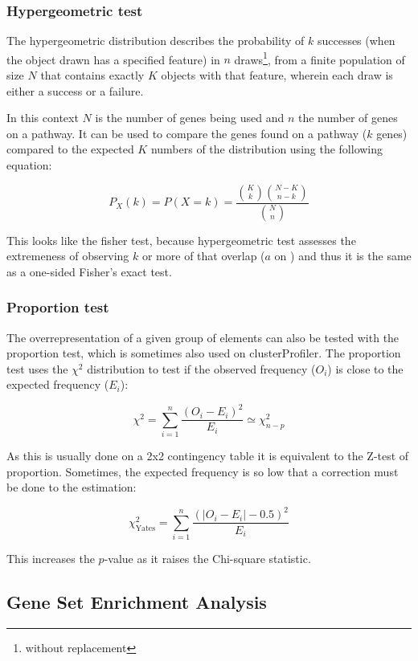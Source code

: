 \documentclass[
  12pt,
  a4paper,
  twoside,
  openright]{book}
\begin{document}
\hypertarget{hypergeometric-test}{%
\subsubsection{Hypergeometric test}\label{hypergeometric-test}}

The hypergeometric distribution describes the probability of \(k\) successes (when the object drawn has a specified feature) in \(n\) draws\footnote{without replacement}, from a finite population of size \(N\) that contains exactly \(K\) objects with that feature, wherein each draw is either a success or a failure.

In this context \(N\) is the number of genes being used and \(n\) the number of genes on a pathway.
It can be used to compare the genes found on a pathway (\(k\) genes) compared to the expected \(K\) numbers of the distribution using the following equation:

\[
P_X(k) = P(X = k) 
= \frac{\binom{K}{k} \binom{N - K}{n-k}}{\binom{N}{n}}
\]

This looks like the fisher test, because hypergeometric test assesses the extremeness of observing \(k\) or more of that overlap (\(a\) on ) and thus it is the same as a one-sided Fisher's exact test.

\hypertarget{proportion-test}{%
\subsubsection{Proportion test}\label{proportion-test}}

The overrepresentation of a given group of elements can also be tested with the proportion test, which is sometimes also used on clusterProfiler.
The proportion test uses the \(\chi^2\) distribution to test if the observed frequency (\(O_i\)) is close to the expected frequency (\(E_i\)):

\[
\chi^2 = \sum_{i =1}^n \dfrac{(O_i - E_i)^2}{E_i} \simeq \chi_{n-p}^2
\]

As this is usually done on a 2x2 contingency table it is equivalent to the Z-test of proportion.
Sometimes, the expected frequency is so low that a correction must be done to the estimation:

\[
\chi_{\text{Yates}}^2 = \sum_{i =1}^n \dfrac{(|O_i - E_i | - 0.5)^2}{E_i}
\]

This increases the \(p\)-value as it raises the Chi-square statistic.

\hypertarget{gene-set-enrichment-analysis}{%
\subsection{Gene Set Enrichment Analysis}\label{gene-set-enrichment-analysis}}
\end{document}
